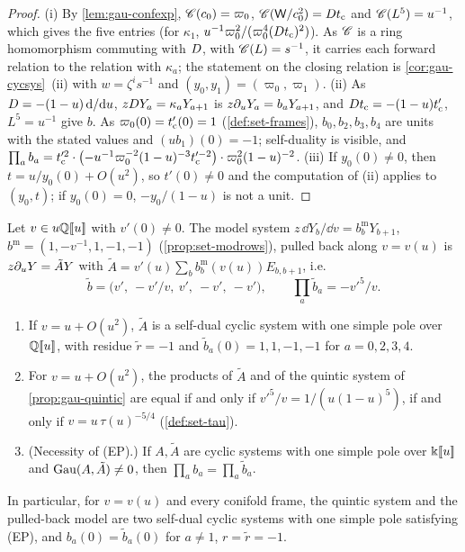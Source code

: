\begin{proof}
(i) By \cref{lem:gau-confexp}, $\mathscr{C}(c_0)=\varpi_0$, $\mathscr{C}(\mathsf W/c_0^2)=Dt_{\mathrm{c}}$ and $\mathscr{C}(L^5)=u^{-1}$, which gives the five entries (for $\kappa_1$, $u^{-1}\varpi_0^2/(\varpi_0^4(Dt_{\mathrm{c}})^2)$). As $\mathscr{C}$ is a ring homomorphism commuting with $D$, with $\mathscr{C}(L)=s^{-1}$, it carries each forward relation to the relation with $\kappa_a$; the statement on the closing relation is \cref{cor:gau-cycsys}~(ii) with $w=\zeta^is^{-1}$ and $(y_0,y_1)=(\varpi_0,\varpi_1)$. (ii) As $D=-(1-u)\,\mathrm{d}/\mathrm{d} u$, $zD Y_a=\kappa_aY_{a+1}$ is $z\partial_uY_a=b_aY_{a+1}$, and $Dt_{\mathrm{c}}=-(1-u)t_{\mathrm{c}}'$, $L^5=u^{-1}$ give $b$. As $\varpi_0(0)=t_{\mathrm{c}}'(0)=1$ (\cref{def:set-frames}), $b_0,b_2,b_3,b_4$ are units with the stated values and $(ub_1)(0)=-1$; self-duality is visible, and $\prod_ab_a=t_{\mathrm{c}}'^2\cdot\bigl(-u^{-1}\varpi_0^{-2}(1-u)^{-3}t_{\mathrm{c}}'^{-2}\bigr)\cdot\varpi_0^2(1-u)^{-2}$. (iii) If $y_0(0)\neq0$, then $t=u/y_0(0)+O(u^2)$, so $t'(0)\neq0$ and the computation of (ii) applies to $(y_0,t)$; if $y_0(0)=0$, $-y_0/(1-u)$ is not a unit.
\end{proof}

\begin{prop}
\label{prop:gau-equalprod}
Let $v\in u\mathbb{Q}[\![ u ]\!]$ with $v'(0)\neq0$. The model system $z\,\dd Y_b/\dd v=b^{\mathrm m}_bY_{b+1}$, $b^{\mathrm m}=(1,-v^{-1},1,-1,-1)$ (\cref{prop:set-modrows}), pulled back along $v=v(u)$ is $z\partial_uY=\tilde AY$ with $\tilde A=v'(u)\sum_bb^{\mathrm m}_b(v(u))E_{b,b+1}$, i.e.
\[
\tilde b=\bigl(v',\ -v'/v,\ v',\ -v',\ -v'\bigr),\qquad \prod_a\tilde b_a=-v'^5/v .
\]
\begin{enumerate}
\item If $v=u+O(u^2)$, $\tilde A$ is a self-dual cyclic system with one simple pole over $\mathbb{Q}[\![ u ]\!]$, with residue $\tilde r=-1$ and $\tilde b_a(0)=1,1,-1,-1$ for $a=0,2,3,4$.
\item For $v=u+O(u^2)$, the products of $\tilde A$ and of the quintic system of \cref{prop:gau-quintic} are equal if and only if $v'^5/v=1/(u(1-u)^5)$, if and only if $v=u\,\tau(u)^{-5/4}$ (\cref{def:set-tau}).
\item (Necessity of (EP).) If $A,\tilde A$ are cyclic systems with one simple pole over $\Bbbk[\![ u ]\!]$ and $\operatorname{Gau}(A,\tilde A)\neq0$, then $\prod_ab_a=\prod_a\tilde b_a$.
\end{enumerate}
In particular, for $v=v(u)$ and every conifold frame, the quintic system and the pulled-back model are two self-dual cyclic systems with one simple pole satisfying (EP), and $b_a(0)=\tilde b_a(0)$ for $a\neq1$, $r=\tilde r=-1$.
\end{prop}

